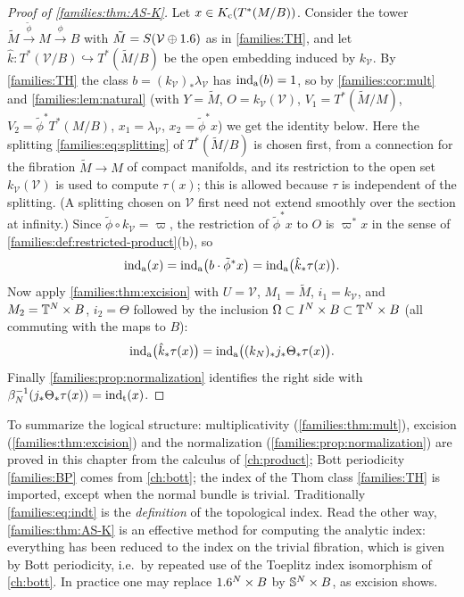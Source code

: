 \begin{proof}[Proof of \cref{families:thm:AS-K}]
  Let $x\in K_{\mathrm{c}}(T^*(M/B))$. Consider the tower $\tilde M\xrightarrow{\tilde
  \phi}M\xrightarrow{\phi}B$ with $\tilde M=S(\mathcal V\oplus1.6)$ as in
  \ref{families:TH}, and let $\hat k:T^*(\mathcal V/B)\hookrightarrow T^*(\tilde
  M/B)$ be the open embedding induced by $k_{\mathcal V}$. By \ref{families:TH}
  the class $b=(k_{\mathcal V})_*\lambda_{\mathcal V}$ has $\operatorname{ind}_{\mathrm{a}}(b)=1$, so by
  \cref{families:cor:mult} and \cref{families:lem:natural} (with $Y=\tilde M$,
  $O=k_{\mathcal V}(\mathcal V)$, $V_1=T^*(\tilde M/M)$,
  $V_2=\tilde\phi^*T^*(M/B)$, $x_1=\lambda_{\mathcal V}$, $x_2=\tilde\phi^*x$)
  we get the identity below. Here the splitting \eqref{families:eq:splitting}
  of $T^*(\tilde M/B)$ is chosen first, from a connection for the fibration
  $\tilde M\to M$ of compact manifolds, and its restriction to the open set
  $k_{\mathcal V}(\mathcal V)$ is used to compute $\tau(x)$; this is allowed
  because $\tau$ is independent of the splitting. (A splitting chosen on
  $\mathcal V$ first need not extend smoothly over the section at infinity.)
  Since $\tilde\phi\circ k_{\mathcal V}=\varpi$, the restriction of
  $\tilde\phi^*x$ to $O$ is $\varpi^*x$ in the sense of
  \cref{families:def:restricted-product}(b), so
  \begin{equation*}
    \operatorname{ind}_{\mathrm{a}}(x)=\operatorname{ind}_{\mathrm{a}}\bigl(b\cdot\tilde\phi^*x\bigr)=\operatorname{ind}_{\mathrm{a}}\bigl(\hat k_*\tau(x)
    \bigr).
  \end{equation*}
  Now apply \cref{families:thm:excision} with $U=\mathcal V$, $M_1=\tilde M$,
  $i_1=k_{\mathcal V}$, and $M_2=\mathbb{T}^N\times B$, $i_2=\Theta$ followed by
  the inclusion $\Omega\subset I^N\times B\subset\mathbb{T}^N\times B$ (all
  commuting with the maps to $B$):
  \begin{equation*}
    \operatorname{ind}_{\mathrm{a}}\bigl(\hat k_*\tau(x)\bigr)=\operatorname{ind}_{\mathrm{a}}\bigl((k_N)_*j_*\Theta_*\tau(x)\bigr).
  \end{equation*}
  Finally \cref{families:prop:normalization} identifies the right side with
  $\beta_N^{-1}(j_*\Theta_*\tau(x))=\operatorname{ind}_{\mathrm{t}}(x)$.
\end{proof}

\begin{remark}\label{families:rem:AS-K-ingredients}
  To summarize the logical structure: multiplicativity
  (\cref{families:thm:mult}), excision (\cref{families:thm:excision}) and the
  normalization (\cref{families:prop:normalization}) are proved in this
  chapter from the calculus of \cref{ch:product}; Bott periodicity
  \ref{families:BP} comes from \cref{ch:bott}; the index of the Thom class
  \ref{families:TH} is imported, except when the normal bundle is trivial.
  Traditionally \eqref{families:eq:indt} is the \emph{definition} of the
  topological index. Read the other way, \cref{families:thm:AS-K} is an
  effective method for computing the analytic index: everything has been
  reduced to the index on the trivial fibration, which is given by Bott
  periodicity, i.e.\ by repeated use of the Toeplitz index isomorphism of
  \cref{ch:bott}. In practice one may replace $1.6^N\times B$ by
  $\mathbb{S}^N\times B$, as excision shows.
\end{remark}


